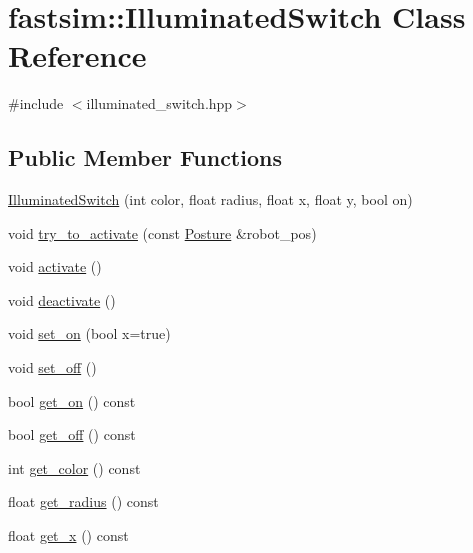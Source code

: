 \hypertarget{classfastsim_1_1_illuminated_switch}{}\section{fastsim\+:\+:Illuminated\+Switch Class Reference}
\label{classfastsim_1_1_illuminated_switch}


{\ttfamily \#include $<$illuminated\+\_\+switch.\+hpp$>$}

\subsection*{Public Member Functions}
\begin{DoxyCompactItemize}
\item 
\hyperlink{classfastsim_1_1_illuminated_switch_a09265b2492cbee9b58ffaf9e6146468c}{Illuminated\+Switch} (int color, float radius, float x, float y, bool on)
\item 
void \hyperlink{classfastsim_1_1_illuminated_switch_ae5637b2dce02faac61b6dd9e21a8985d}{try\+\_\+to\+\_\+activate} (const \hyperlink{classfastsim_1_1_posture}{Posture} \&robot\+\_\+pos)
\item 
void \hyperlink{classfastsim_1_1_illuminated_switch_a095aae0976a4f99a2e2aaad0e94a6b40}{activate} ()
\item 
void \hyperlink{classfastsim_1_1_illuminated_switch_af13e4e31118b39d3d2c88356e149f0b7}{deactivate} ()
\item 
void \hyperlink{classfastsim_1_1_illuminated_switch_ac55c64344984625e197c8be77fb4ae9e}{set\+\_\+on} (bool x=true)
\item 
void \hyperlink{classfastsim_1_1_illuminated_switch_a525fa3615e66cae45e6d80c390244e73}{set\+\_\+off} ()
\item 
bool \hyperlink{classfastsim_1_1_illuminated_switch_a183bcaac9da4aae75026625d6a82c76f}{get\+\_\+on} () const 
\item 
bool \hyperlink{classfastsim_1_1_illuminated_switch_acb1748d43ed318adb448541f442b77e0}{get\+\_\+off} () const 
\item 
int \hyperlink{classfastsim_1_1_illuminated_switch_a11f9cc3bdd332e64254629b64bbb02c5}{get\+\_\+color} () const 
\item 
float \hyperlink{classfastsim_1_1_illuminated_switch_a0c16bd6906af7871a2ddf412e1e7619c}{get\+\_\+radius} () const 
\item 
float \hyperlink{classfastsim_1_1_illuminated_switch_a03e3bd5bbf721102c6c40e41304d809c}{get\+\_\+x} () const 

\end{DoxyCompactItemize}
